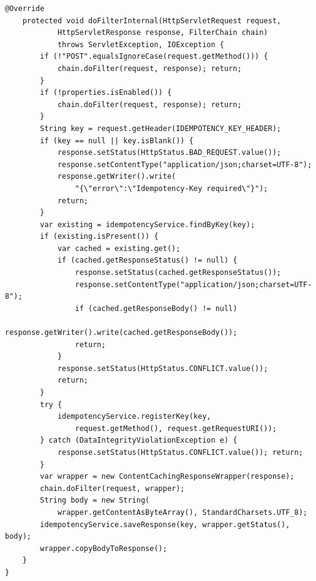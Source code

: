 \begin{lstlisting}[caption={IdempotencyFilter.java --- HTTP-фильтр идемпотентности}]
    @Override
    protected void doFilterInternal(HttpServletRequest request,
            HttpServletResponse response, FilterChain chain)
            throws ServletException, IOException {
        if (!"POST".equalsIgnoreCase(request.getMethod())) {
            chain.doFilter(request, response); return;
        }
        if (!properties.isEnabled()) {
            chain.doFilter(request, response); return;
        }
        String key = request.getHeader(IDEMPOTENCY_KEY_HEADER);
        if (key == null || key.isBlank()) {
            response.setStatus(HttpStatus.BAD_REQUEST.value());
            response.setContentType("application/json;charset=UTF-8");
            response.getWriter().write(
                "{\"error\":\"Idempotency-Key required\"}");
            return;
        }
        var existing = idempotencyService.findByKey(key);
        if (existing.isPresent()) {
            var cached = existing.get();
            if (cached.getResponseStatus() != null) {
                response.setStatus(cached.getResponseStatus());
                response.setContentType("application/json;charset=UTF-8");
                if (cached.getResponseBody() != null)
                    response.getWriter().write(cached.getResponseBody());
                return;
            }
            response.setStatus(HttpStatus.CONFLICT.value());
            return;
        }
        try {
            idempotencyService.registerKey(key,
                request.getMethod(), request.getRequestURI());
        } catch (DataIntegrityViolationException e) {
            response.setStatus(HttpStatus.CONFLICT.value()); return;
        }
        var wrapper = new ContentCachingResponseWrapper(response);
        chain.doFilter(request, wrapper);
        String body = new String(
            wrapper.getContentAsByteArray(), StandardCharsets.UTF_8);
        idempotencyService.saveResponse(key, wrapper.getStatus(), body);
        wrapper.copyBodyToResponse();
    }
}
\end{lstlisting}


